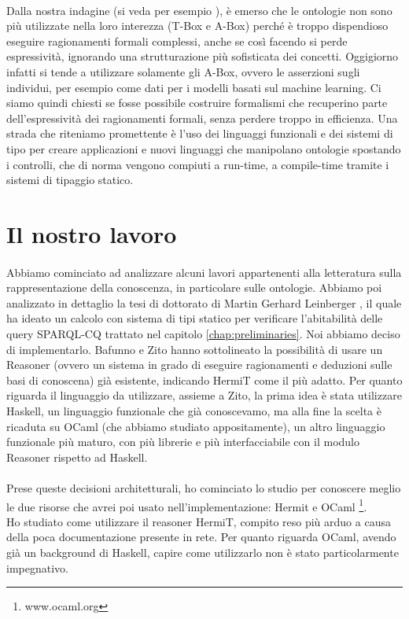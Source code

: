 \paragraph{} Dalla nostra indagine (si veda per esempio \cite{baader2017introductionDL}), è emerso che le ontologie non sono più utilizzate nella loro interezza (T-Box e A-Box) perché è troppo dispendioso eseguire ragionamenti formali complessi, anche se così facendo si perde espressività, ignorando una strutturazione più sofisticata dei concetti. Oggigiorno infatti si tende a utilizzare solamente gli A-Box, ovvero le asserzioni sugli individui, per esempio come dati per i modelli basati sul machine learning. Ci siamo quindi chiesti se fosse possibile costruire formalismi che recuperino parte dell'espressività dei ragionamenti formali, senza perdere troppo in efficienza. Una strada che riteniamo promettente è l'uso dei linguaggi funzionali e dei sistemi di tipo per creare applicazioni e nuovi linguaggi che manipolano ontologie spostando i controlli, che di norma vengono compiuti a run-time, a compile-time tramite i sistemi di tipaggio statico.     

\section{Il nostro lavoro}
\paragraph{} Abbiamo cominciato ad analizzare alcuni lavori appartenenti alla letteratura sulla rappresentazione della conoscenza, in particolare sulle ontologie. Abbiamo poi analizzato in dettaglio la tesi di dottorato di Martin Gerhard Leinberger \cite{leinbergerphdthesis}, il quale ha ideato un calcolo con sistema di tipi statico per verificare l'abitabilità delle query SPARQL-CQ trattato nel capitolo \ref{chap:preliminaries}. Noi abbiamo deciso di implementarlo. Bafunno e Zito hanno sottolineato la possibilità di usare un Reasoner (ovvero un sistema in grado di eseguire ragionamenti e deduzioni sulle basi di conoscena) già esistente, indicando HermiT come il più adatto. Per quanto riguarda il linguaggio da utilizzare, assieme a Zito, la prima idea è stata utilizzare Haskell, un linguaggio funzionale che già conoscevamo, ma alla fine la scelta è ricaduta su OCaml (che abbiamo studiato appositamente), un altro linguaggio funzionale più maturo, con più librerie e più interfacciabile con il modulo Reasoner rispetto ad Haskell. 

\paragraph{} Prese queste decisioni architetturali, ho cominciato lo studio per conoscere meglio le due risorse che avrei poi usato nell'implementazione: Hermit \cite{HermiT} e OCaml \footnote{www.ocaml.org}.\\
Ho studiato come utilizzare il reasoner HermiT, compito reso più arduo a causa della poca documentazione presente in rete. Per quanto riguarda OCaml, avendo già un background di Haskell, capire come utilizzarlo non è stato particolarmente impegnativo. \\

